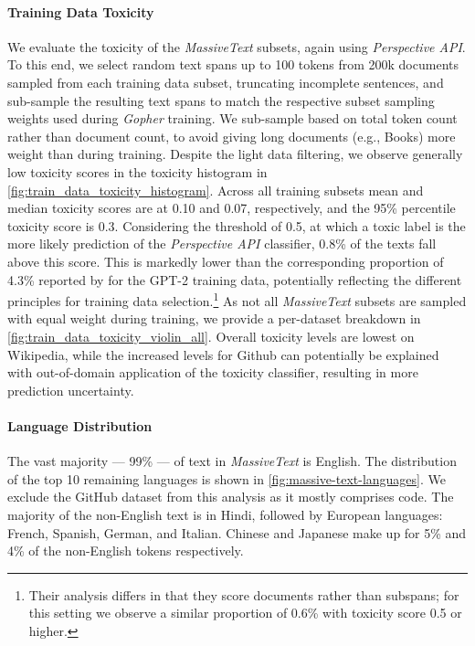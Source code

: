 \documentclass[11pt, a4paper, logo, internal, copyright, nonumbering]{deepmind}
\newcommand{\massivetext}{\textit{MassiveText}\xspace}
\newcommand{\gopher}{\textit{Gopher}\xspace}
\newcommand{\perspectiveapi}{\textit{Perspective API}\xspace}
\begin{document}
\paragraph{Training Data Toxicity}
\label{sec:training_data_toxicity}
We evaluate the toxicity of the \massivetext subsets, again using \perspectiveapi.
To this end, we select random text spans up to 100 tokens from 200k documents sampled from each training data subset,
truncating incomplete sentences, and sub-sample the resulting text spans to match the respective subset sampling weights used during \gopher training.
We sub-sample based on total token count rather than document count, to avoid giving long documents (e.g., Books) more weight than during training.
%
Despite the light data filtering, we observe generally low toxicity scores in the toxicity histogram in \autoref{fig:train_data_toxicity_histogram}. 
Across all training subsets mean and median toxicity scores are at 0.10 and 0.07, respectively, and the 95\% percentile toxicity score is 0.3.
%
Considering the threshold of 0.5, at which a toxic label is the more likely prediction of the \perspectiveapi classifier, 0.8\% of the texts fall above this score.
%
This is markedly lower than the corresponding proportion of 4.3\% reported by \cite{gehman2020realtoxicityprompts} for the GPT-2 training data, potentially reflecting the different principles for training data selection.\footnote{Their analysis differs in that they score documents rather than subspans; for this setting we observe a similar proportion of 0.6\% with toxicity score 0.5 or higher.}
%
As not all \massivetext subsets are sampled with equal weight during training, we provide a per-dataset breakdown in \autoref{fig:train_data_toxicity_violin_all}.
% 
Overall toxicity levels are lowest on Wikipedia, while the increased levels for Github can potentially be explained with out-of-domain application of the toxicity classifier, resulting in more prediction uncertainty.

\paragraph{Language Distribution}
The vast majority — 99\% — of text in \massivetext is English. The distribution of the top 10 remaining languages is shown in \autoref{fig:massive-text-languages}. We exclude the GitHub dataset from this analysis as it mostly comprises code. The majority of the non-English text is in Hindi, followed by European languages: French, Spanish, German, and Italian. Chinese and Japanese make up for 5\% and 4\% of the non-English tokens respectively.
\end{document}
